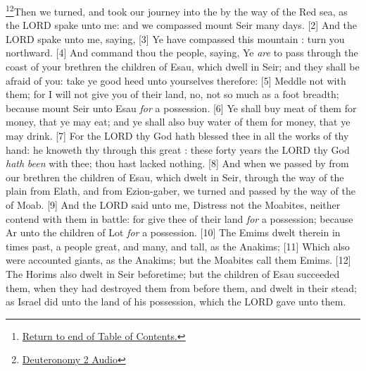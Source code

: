\footnote{\textcolor[cmyk]{0.99998,1,0,0}{\hyperlink{TOC}{Return to end of Table of Contents.}}}\footnote{\href{https://audiobible.com/bible/deuteronomy_2.html}{\textcolor[cmyk]{0.99998,1,0,0}{Deuteronomy 2 Audio}}}\textcolor[cmyk]{0.99998,1,0,0}{Then we turned, and took our journey into the  by the way of the Red sea, as the LORD spake unto me: and we compassed mount Seir many days.}
[2] \textcolor[cmyk]{0.99998,1,0,0}{And the LORD spake unto me, saying,}
[3] \textcolor[cmyk]{0.99998,1,0,0}{Ye have compassed this mountain : turn you northward.}
[4] \textcolor[cmyk]{0.99998,1,0,0}{And command thou the people, saying, Ye \emph{are} to pass through the coast of your brethren the children of Esau, which dwell in Seir; and they shall be afraid of you: take ye good heed unto yourselves therefore:}
[5] \textcolor[cmyk]{0.99998,1,0,0}{Meddle not with them; for I will not give you of their land, no, not so much as a foot breadth; because  mount Seir unto Esau \emph{for} a possession.}
[6] \textcolor[cmyk]{0.99998,1,0,0}{Ye shall buy meat of them for money, that ye may eat; and ye shall also buy water of them for money, that ye may drink.}
[7] \textcolor[cmyk]{0.99998,1,0,0}{For the LORD thy God hath blessed thee in all the works of thy hand: he knoweth thy  through this great : these forty years the LORD thy God \emph{hath} \emph{been} with thee; thou hast lacked nothing.}
[8] \textcolor[cmyk]{0.99998,1,0,0}{And when we passed by from our brethren the children of Esau, which dwelt in Seir, through the way of the plain from Elath, and from Ezion-gaber, we turned and passed by the way of the  of Moab.}
[9] \textcolor[cmyk]{0.99998,1,0,0}{And the LORD said unto me, Distress not the Moabites, neither contend with them in battle: for  give thee of their land \emph{for} a possession; because  Ar unto the children of Lot \emph{for} a possession.}
[10] \textcolor[cmyk]{0.99998,1,0,0}{The Emims dwelt therein in times past, a people great, and many, and tall, as the Anakims;}
[11] \textcolor[cmyk]{0.99998,1,0,0}{Which also were accounted giants, as the Anakims; but the Moabites call them Emims.}
[12] \textcolor[cmyk]{0.99998,1,0,0}{The Horims also dwelt in Seir beforetime; but the children of Esau succeeded them, when they had destroyed them from before them, and dwelt in their stead; as Israel did unto the land of his possession, which the LORD gave unto them.}
